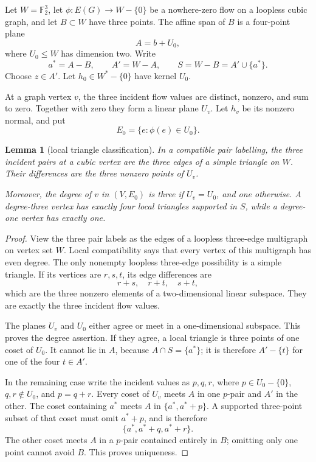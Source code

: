 \documentclass[11pt]{article}
\newtheorem{lemma}[theorem]{Lemma}
\theoremstyle{definition}
\theoremstyle{remark}
\newcommand{\F}{\mathbb F}
\newcommand{\1}{\mathbf 1}
\begin{document}
Let \(W=\F_2^3\), let \(\phi:E(G)\to W-\{0\}\) be a nowhere-zero flow on
a loopless cubic graph, and let \(B\subset W\) have three points.  The
affine span of \(B\) is a four-point plane
\[
 A=b+U_0,
\]
where \(U_0\leq W\) has dimension two.  Write
\[
 a^*=A-B,\qquad A'=W-A,\qquad S=W-B=A'\cup\{a^*\}.       \tag{4.1}
\]
Choose \(z\in A'\).  Let \(h_0\in W^*-\{0\}\) have kernel \(U_0\).

At a graph vertex \(v\), the three incident flow values are distinct,
nonzero, and sum to zero.  Together with zero they form a linear plane
\(U_v\).  Let \(h_v\) be its nonzero normal, and put
\[
 E_0=\{e:\phi(e)\in U_0\}.                                \tag{4.2}
\]

\begin{lemma}[local triangle classification]\label{lem:local}
In a compatible pair labelling, the three incident pairs at a cubic
vertex are the three edges of a simple triangle on \(W\).  Their
differences are the three nonzero points of \(U_v\).

Moreover, the degree of \(v\) in \((V,E_0)\) is three if \(U_v=U_0\),
and one otherwise.  A degree-three vertex has exactly four local triangles
supported in \(S\), while a degree-one vertex has exactly one.
\end{lemma}

\begin{proof}
View the three pair labels as the edges of a loopless three-edge
multigraph on vertex set \(W\).  Local compatibility says that every
vertex of this multigraph has even degree.  The only nonempty loopless
three-edge possibility is a simple triangle.  If its vertices are
\(r,s,t\), its edge differences are
\[
 r+s,\quad r+t,\quad s+t,
\]
which are the three nonzero elements of a two-dimensional linear
subspace.  They are exactly the three incident flow values.

The planes \(U_v\) and \(U_0\) either agree or meet in a one-dimensional
subspace.  This proves the degree assertion.  If they agree, a local
triangle is three points of one coset of \(U_0\).  It cannot lie in \(A\),
because \(A\cap S=\{a^*\}\); it is therefore
\(A'-\{t\}\) for one of the four \(t\in A'\).

In the remaining case write the incident values as \(p,q,r\), where
\(p\in U_0-\{0\}\), \(q,r\notin U_0\), and \(p=q+r\).
Every coset of \(U_v\) meets \(A\) in one \(p\)-pair and \(A'\) in the
other.  The coset containing \(a^*\) meets \(A\) in
\(\{a^*,a^*+p\}\).  A supported three-point subset of that coset must omit
\(a^*+p\), and is therefore
\[
 \{a^*,a^*+q,a^*+r\}.                                    \tag{4.3}
\]
The other coset meets \(A\) in a \(p\)-pair contained entirely in \(B\);
omitting only one point cannot avoid \(B\).  This proves uniqueness.
\end{proof}
\end{document}
